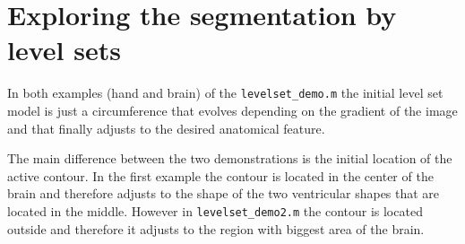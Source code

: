 \section{Exploring the segmentation by level sets}

In both examples (hand and brain) of the \texttt{levelset\_demo.m} the initial level set model is just a circumference that evolves depending on the gradient of the image and that finally adjusts to the desired anatomical feature.

The main difference between the two demonstrations is the initial location of the active contour. In the first example the contour is located in the center of the brain and therefore adjusts to the shape of the two ventricular shapes that are located in the middle. However in \texttt{levelset\_demo2.m} the contour is located outside and therefore it adjusts to the region with biggest area of the brain.